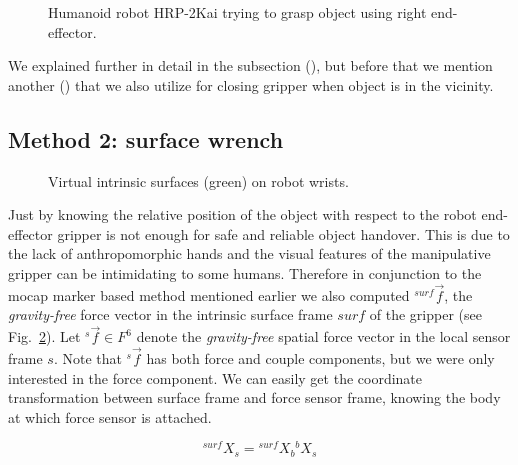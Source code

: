 \begin{figure}[ht]
	\caption{Humanoid robot HRP-2Kai trying to grasp object using right end-effector.}
	\label{fig:markerEf1}
\end{figure} 

We explained further in detail in the subsection (), but before that we mention another () that we also utilize for closing gripper when object is in the vicinity.



\subsection{Method 2: surface wrench}\label{surface wrench}

\begin{figure}[ht]
	\caption{Virtual intrinsic surfaces (green) on robot wrists.}
	\label{fig:wrist-surface2}
\end{figure}


Just by knowing the relative position of the object with respect to the robot end-effector gripper is not enough for safe and reliable object handover. This is due to the lack of anthropomorphic hands and the visual features of the manipulative gripper can be intimidating to some humans. Therefore in conjunction to the mocap marker based method mentioned earlier we also computed ${}^{surf}\vec{f}$, the \textit{gravity-free} force vector in the intrinsic surface frame $surf$ of the gripper (see Fig.~\ref{fig:wrist-surface2}). Let ${}^s\vec{f}\in F^6$ denote the \textit{gravity-free} spatial force vector in the local sensor frame $s$. Note that ${}^s\vec{f}$ has both force and couple components, but we were only interested in the force component. We can easily get the coordinate transformation between surface frame and force sensor frame, knowing the body at which force sensor is attached.

\begin{equation}\label{X_s_surf}
    {}^{surf}X_{s} = {}^{surf}X_{b} {}^{b}X_s
\end{equation}

